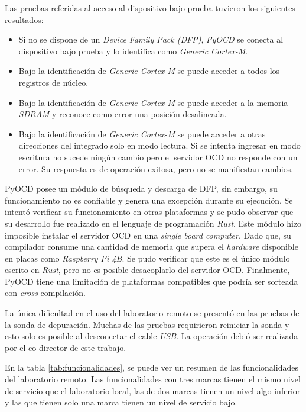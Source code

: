 Las pruebas referidas al acceso al dispositivo bajo prueba tuvieron los siguientes resultados:

\begin{itemize}
    \item Si no se dispone de un \emph{Device Family Pack (DFP)}, \emph{PyOCD} se conecta al dispositivo bajo prueba y lo identifica como \emph{Generic Cortex-M}.
    \item Bajo la identificación de \emph{Generic Cortex-M} se puede acceder a todos los registros de núcleo.
    \item Bajo la identificación de \emph{Generic Cortex-M} se puede acceder a la memoria \emph{SDRAM} y reconoce como error una posición desalineada.
    \item Bajo la identificación de \emph{Generic Cortex-M} se puede acceder a otras direcciones del integrado solo en modo lectura.
        Si se intenta ingresar en modo escritura no sucede ningún cambio pero el servidor OCD no responde con un error.
        Su respuesta es de operación exitosa, pero no se manifiestan cambios.
\end{itemize}

PyOCD posee un módulo de búsqueda y descarga de DFP, sin embargo, su funcionamiento no es confiable y genera una excepción durante su ejecución.
Se intentó verificar su funcionamiento en otras plataformas y se pudo observar que su desarrollo fue realizado en el lenguaje de programación \emph{Rust}.
Este módulo hizo imposible instalar el servidor OCD en una \emph{single board computer}.
Dado que, su compilador consume una cantidad de memoria que supera el \emph{hardware} disponible en placas como \emph{Raspberry Pi 4B}.
Se pudo verificar que este es el único módulo escrito en \emph{Rust}, pero no es posible desacoplarlo del servidor OCD.
Finalmente, PyOCD tiene una limitación de plataformas compatibles que podría ser sorteada con \emph{cross} compilación.

La única dificultad en el uso del laboratorio remoto se presentó en las pruebas de la sonda de depuración.
Muchas de las pruebas requirieron reiniciar la sonda y esto solo es posible al desconectar el cable \emph{USB}.
La operación debió ser realizada por el co-director de este trabajo.

En la tabla \ref{tab:funcionalidades}, se puede ver un resumen de las funcionalidades del laboratorio remoto.
Las funcionalidades con tres marcas tienen el mismo nivel de servicio que el laboratorio local, las de dos marcas tienen un nivel algo inferior y las que tienen solo una marca tienen un nivel de servicio bajo.

